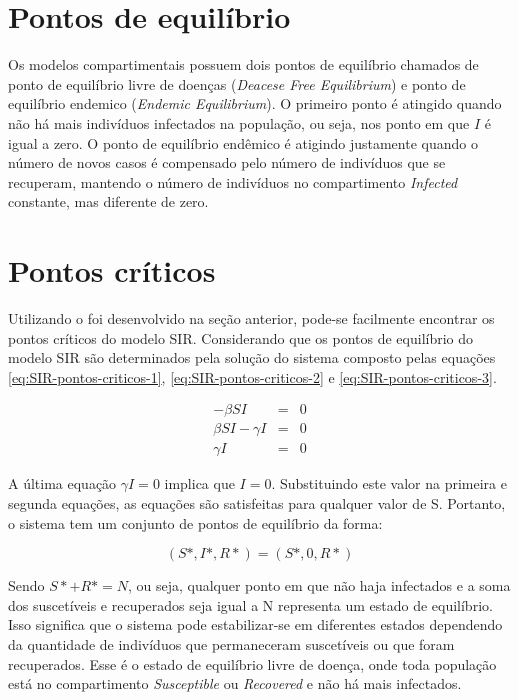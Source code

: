\section{Pontos de equilíbrio}

Os modelos compartimentais possuem dois pontos de equilíbrio chamados de 
ponto de equilíbrio livre de doenças (\textit{Deacese Free Equilibrium}) e 
ponto de equilíbrio endemico (\textit{Endemic Equilibrium}). 
O primeiro ponto é atingido quando não há mais indivíduos infectados na população,
ou seja, nos ponto em que $I$ é igual a zero. O ponto de equilíbrio endêmico
é atigindo justamente quando o número de novos casos é compensado pelo número
de indivíduos que se recuperam, mantendo o número de indivíduos no compartimento
\textit{Infected} constante, mas diferente de zero.

\section{Pontos críticos}

Utilizando o foi desenvolvido na seção anterior, pode-se facilmente encontrar os 
pontos críticos do modelo SIR. Considerando que os pontos de equilíbrio do modelo 
SIR são determinados pela solução do sistema composto pelas equações
\ref{eq:SIR-pontos-criticos-1}, \ref{eq:SIR-pontos-criticos-2} e \ref{eq:SIR-pontos-criticos-3}.

\begin{eqnarray}
    -\beta SI &=& 0 \label{eq:SIR-pontos-criticos-1}\\
    \beta SI - \gamma I &=& 0 \label{eq:SIR-pontos-criticos-2}\\
    \gamma I &=& 0 \label{eq:SIR-pontos-criticos-3}
\end{eqnarray}

A última equação $\gamma I=0$ implica que $I=0$. Substituindo este valor na primeira e 
segunda equações, as equações são satisfeitas para qualquer valor de S. 
Portanto, o sistema tem um conjunto de pontos de equilíbrio da forma:

\begin{equation}\label{eq:sir-conjunto-solucoes-eq-livre-doenca}
    (S* , I*, R*) = (S* , 0, R*)    
\end{equation}

Sendo $S* + R* = N$, ou seja, qualquer ponto em que não haja infectados e a soma 
dos suscetíveis e recuperados seja igual a N representa um estado de equilíbrio. 
Isso significa que o sistema pode estabilizar-se em diferentes estados dependendo 
da quantidade de indivíduos que permaneceram suscetíveis ou que foram recuperados. 
Esse é o estado de equilíbrio livre de doença, onde toda 
população está no compartimento \textit{Susceptible} ou \textit{Recovered} e não 
há mais infectados.

